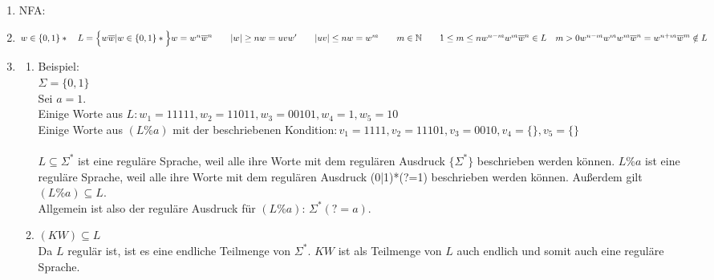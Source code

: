 \documentclass[a4paper]{scrartcl}
\title{\titleinfo}
\author{Arne Feil}
\date{\today}
\newcommand{\aufgabe}[1]{\item[\textbf{#1}]}
\begin{document}
\begin{enumerate}
\aufgabe{2.3}
NFA:\\
\aufgabe{2.4}
$w \in \{0,1\}* \quad L=\Big\{w\overline{w} | w \in \{0,1\}* \Big\} \\
w = w^n \overline{w}^n \quad \quad |w| \geq n \\
w = uvw' \quad \quad |uv| \leq n \\
w = w^m \quad \quad m \in \mathbb{N} \quad \quad 1 \leq m \leq n \\
w^{n-m}w^m\overline{w}^n \in L \quad m>0 \\
w^{n-m} w^m w^m \overline{w}^n = w^{n+m}\overline{w}^m \notin L$

\aufgabe{2.5}
\begin{enumerate}[1.]
\item
Beispiel: \\
\(\Sigma = \{0, 1\}\) \\
Sei \(a = 1\). \\
Einige Worte aus \(L: w_1 = 11111, w_2 = 11011, w_3 = 00101, w_4 = 1, w_5 = 10\) \\
Einige Worte aus \((L\%a)\) mit der beschriebenen Kondition\(: v_1 = 1111, v_2 = 11101, v_3 = 0010, v_4 = \{\}, v_5 = \{\}\) \\
\\
\(L \subseteq \Sigma^*\) ist eine reguläre Sprache, weil alle ihre Worte mit
dem regulären Ausdruck \(\{\Sigma^*\}\) beschrieben werden können. \(L\%a\) ist
eine reguläre Sprache, weil alle ihre Worte mit dem regulären Ausdruck (0|1)*(?=1)
beschrieben werden können. Außerdem gilt \((L\%a) \subseteq L \).\\
Allgemein ist also der reguläre Ausdruck für \((L\%a)\): \(\Sigma^*(?=a)\).

\item
$(KW) \subseteq L$ \\
Da $L$ regulär ist, ist es eine endliche Teilmenge von $\Sigma^*$. $KW$ ist als
Teilmenge von $L$ auch endlich und somit auch eine reguläre Sprache.
\end{enumerate}
\end{enumerate}
\end{document}

